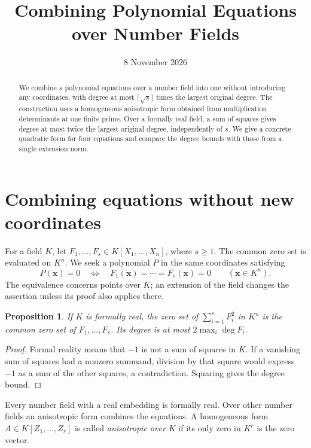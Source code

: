 \documentclass[11pt,a4paper]{article}
\title{Combining Polynomial Equations over Number Fields}
\author{}
\date{8 November 2026}
\newtheorem{proposition}[theorem]{Proposition}
\theoremstyle{definition}
\begin{document}
\maketitle
\begin{abstract}
We combine $s$ polynomial equations over a number field into one
without introducing any coordinates, with degree at most
$\lceil\sqrt{s}\rceil$ times the largest original degree. The
construction uses a homogeneous anisotropic form obtained from
multiplication determinants at one finite prime. Over a formally
real field, a sum of squares gives degree at most twice the largest
original degree, independently of $s$. We give a concrete quadratic
form for four equations and compare the degree bounds with those
from a single extension norm.
\end{abstract}

\section{Combining equations without new coordinates}

For a field $K$, let $F_1,\ldots,F_s\in K[X_1,\ldots,X_n]$,
where $s\ge1$. The common zero set is evaluated on $K^n$.
We seek a polynomial $P$ in the same coordinates satisfying
\[
 P(\mathbf x)=0
 \quad\Longleftrightarrow\quad
 F_1(\mathbf x)=\cdots=F_s(\mathbf x)=0
                    \qquad(\mathbf x\in K^n).
\]
The equivalence concerns points over $K$; an extension of the
field changes the assertion unless its proof also applies there.

\begin{proposition}\label{sys:sum-squares}
If $K$ is formally real, the zero set of $\sum_{i=1}^s F_i^2$
in $K^n$ is the common zero set of $F_1,\ldots,F_s$. Its degree is at most
$2\max_i\deg F_i$.
\end{proposition}
\begin{proof}
Formal reality means that $-1$ is not a sum of squares in $K$.
If a vanishing sum of squares had a nonzero summand, division
by that square would express $-1$ as a sum of the other squares,
a contradiction. Squaring gives the degree bound.
\end{proof}

Every number field with a real embedding is formally real. Over
other number fields an anisotropic form combines the equations.
A homogeneous form $A\in K[Z_1,\ldots,Z_r]$ is
called \emph{anisotropic over $K$} if its only zero in $K^r$ is
the zero vector.
\end{document}
